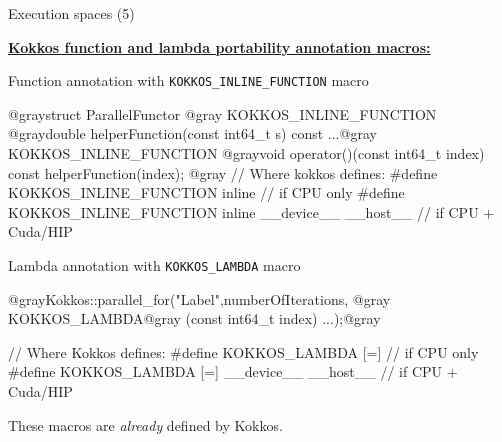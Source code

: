 
\begin{frame}[fragile]{Execution spaces (5)}

  \textbf{\ul{Kokkos function and lambda portability annotation macros:}}

  \vspace{4pt}

  {Function annotation with \texttt{\footnotesize KOKKOS\_INLINE\_FUNCTION} macro}

  \begin{code}[keywords={}, frame=single, basicstyle=\tiny\ttfamily]
@graystruct ParallelFunctor {@gray
  KOKKOS_INLINE_FUNCTION
  @graydouble helperFunction(const int64_t s) const {...}@gray
  KOKKOS_INLINE_FUNCTION
  @grayvoid operator()(const int64_t index) const {
    helperFunction(index);
  }
}@gray
// Where kokkos defines:
#define KOKKOS_INLINE_FUNCTION inline                     // if CPU only
#define KOKKOS_INLINE_FUNCTION inline __device__ __host__ // if CPU + Cuda/HIP
  \end{code}

  \pause

  {Lambda annotation with \texttt{\footnotesize KOKKOS\_LAMBDA} macro}

  \begin{code}[keywords={}, frame=single, basicstyle=\tiny\ttfamily]
@grayKokkos::parallel_for("Label",numberOfIterations, @gray
  KOKKOS_LAMBDA@gray (const int64_t index) {...});@gray

// Where Kokkos defines:
#define KOKKOS_LAMBDA [=]                     // if CPU only
#define KOKKOS_LAMBDA [=] __device__ __host__ // if CPU + Cuda/HIP
  \end{code}

  These macros are \emph{already} defined by Kokkos.

  \vspace{-10pt}

\end{frame}


